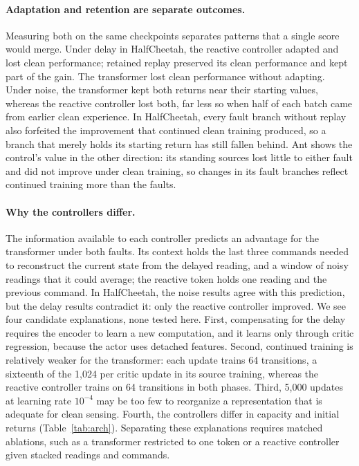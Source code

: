 \paragraph{Adaptation and retention are separate outcomes.} Measuring both on the same checkpoints separates patterns that a single score would merge. Under delay in HalfCheetah, the reactive controller adapted and lost clean performance; retained replay preserved its clean performance and kept part of the gain. The transformer lost clean performance without adapting. Under noise, the transformer kept both returns near their starting values, whereas the reactive controller lost both, far less so when half of each batch came from earlier clean experience. In HalfCheetah, every fault branch without replay also forfeited the improvement that continued clean training produced, so a branch that merely holds its starting return has still fallen behind. Ant shows the control's value in the other direction: its standing sources lost little to either fault and did not improve under clean training, so changes in its fault branches reflect continued training more than the faults.

\paragraph{Why the controllers differ.} The information available to each controller predicts an advantage for the transformer under both faults. Its context holds the last three commands needed to reconstruct the current state from the delayed reading, and a window of noisy readings that it could average; the reactive token holds one reading and the previous command. In HalfCheetah, the noise results agree with this prediction, but the delay results contradict it: only the reactive controller improved. We see four candidate explanations, none tested here. First, compensating for the delay requires the encoder to learn a new computation, and it learns only through critic regression, because the actor uses detached features. Second, continued training is relatively weaker for the transformer: each update trains 64 transitions, a sixteenth of the 1,024 per critic update in its source training, whereas the reactive controller trains on 64 transitions in both phases. Third, 5,000 updates at learning rate $10^{-4}$ may be too few to reorganize a representation that is adequate for clean sensing. Fourth, the controllers differ in capacity and initial returns (Table~\ref{tab:arch}). Separating these explanations requires matched ablations, such as a transformer restricted to one token or a reactive controller given stacked readings and commands.

